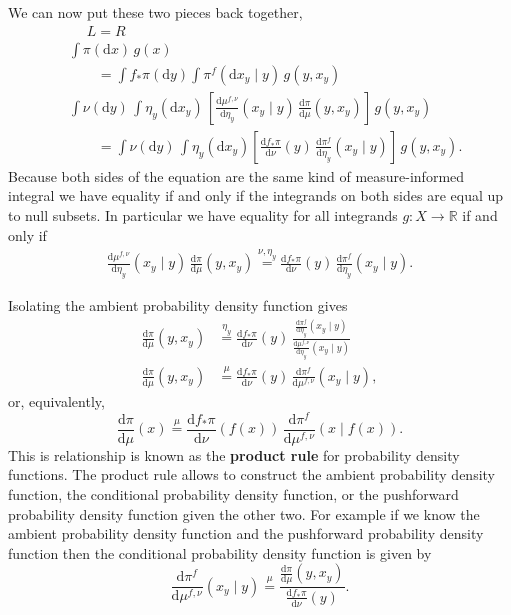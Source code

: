 \documentclass[
  letterpaper,
  DIV=11,
  numbers=noendperiod]{scrartcl}
\begin{document}
We can now put these two pieces back together, \begin{align*}
&
\quad\; L = R
\\
&
\int \pi( \mathrm{d} x ) \, g(x)
\\
&\quad\quad=
\int f_{*} \pi (\mathrm{d} y)
\int \pi^{f}( \mathrm{d}x_{y} \mid y ) \, g(y, x_{y})
\\
&
\int \nu ( \mathrm{d} y ) \,
\int \eta_{y} ( \mathrm{d} x_{y} ) \,
\left[ \frac{ \mathrm{d} \mu^{f, \nu}}{ \mathrm{d} \eta_{y} }(x_{y} \mid y) \,
\frac{ \mathrm{d} \pi}{ \mathrm{d} \mu }(y, x_{y}) \right] \, g(y, x_{y})
\\
&\quad\quad=
\int \nu (\mathrm{d} y) \,
\int \eta_{y} ( \mathrm{d}x_{y} )
\left[ \frac{ \mathrm{d}  f_{*} \pi }{ \mathrm{d}  \nu  }(y)
       \, \frac{ \mathrm{d} \pi^{f}}{ \mathrm{d} \eta_{y} }(x_{y} \mid y) \right] \, g(y, x_{y}).
\end{align*} Because both sides of the equation are the same kind of
measure-informed integral we have equality if and only if the integrands
on both sides are equal up to null subsets. In particular we have
equality for all integrands \(g : X \rightarrow \mathbb{R}\) if and only
if \begin{align*}
\frac{ \mathrm{d} \mu^{f, \nu}}{ \mathrm{d} \eta_{y} }(x_{y} \mid y) \,
\frac{ \mathrm{d} \pi}{ \mathrm{d} \mu }(y, x_{y})
\overset{ \nu, \eta_{y} }{ = }
\frac{ \mathrm{d}  f_{*} \pi }{ \mathrm{d}  \nu  }(y) \, \frac{ \mathrm{d} \pi^{f}}{ \mathrm{d} \eta_{y} }(x_{y} \mid y).
\end{align*}

Isolating the ambient probability density function gives \begin{align*}
\frac{ \mathrm{d} \pi}{ \mathrm{d} \mu }(y, x_{y})
&\overset{ \eta_{y} }{ = }
\frac{ \mathrm{d}  f_{*} \pi }{ \mathrm{d} \nu }(y) \,
\frac{ \frac{ \mathrm{d}  \pi^{f} }{ \mathrm{d}  \eta_{y}  } (x_{y} \mid y) }
{ \frac{ \mathrm{d}  \mu^{f, \nu} }{ \mathrm{d}  \eta_{y}  } (x_{y} \mid y) }
\\
\frac{ \mathrm{d} \pi}{ \mathrm{d} \mu }(y, x_{y})
&\overset{ \mu }{ = }
\frac{ \mathrm{d}  f_{*} \pi }{ \mathrm{d} \nu }(y) \,
\frac{ \mathrm{d}  \pi^{f} }{ \mathrm{d}  \mu^{f, \nu}  } (x_{y} \mid y),
\end{align*} or, equivalently, \[
\frac{ \mathrm{d} \pi}{ \mathrm{d} \mu }(x)
\overset{ \mu }{ = }
\frac{ \mathrm{d}  f_{*} \pi }{ \mathrm{d} \nu }(f(x)) \,
\frac{ \mathrm{d}  \pi^{f} }{ \mathrm{d}  \mu^{f, \nu}  } (x \mid f(x)).
\] This is relationship is known as the \textbf{product rule} for
probability density functions. The product rule allows to construct the
ambient probability density function, the conditional probability
density function, or the pushforward probability density function given
the other two. For example if we know the ambient probability density
function and the pushforward probability density function then the
conditional probability density function is given by \[
\frac{ \mathrm{d}  \pi^{f} }{ \mathrm{d}  \mu^{f, \nu}  } (x_{y} \mid y)
\overset{ \mu }{ = }
\frac{ \frac{ \mathrm{d} \pi}{ \mathrm{d} \mu }(y, x_{y}) }{ \frac{ \mathrm{d}  f_{*} \pi }{ \mathrm{d} \nu }(y) }.
\]
\end{document}
